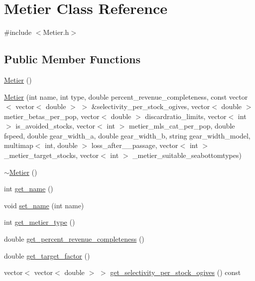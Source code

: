 \hypertarget{class_metier}{}\section{Metier Class Reference}
\label{class_metier}


{\ttfamily \#include $<$Metier.\+h$>$}

\subsection*{Public Member Functions}
\begin{DoxyCompactItemize}
\item 
\mbox{\hyperlink{class_metier_afc62233bc20706b775f08a82bfd8fc4b}{Metier}} ()
\item 
\mbox{\hyperlink{class_metier_a362481dafaec1397c8537350038492e6}{Metier}} (int name, int type, double percent\+\_\+revenue\+\_\+completeness, const vector$<$ vector$<$ double $>$ $>$ \&selectivity\+\_\+per\+\_\+stock\+\_\+ogives, vector$<$ double $>$ metier\+\_\+betas\+\_\+per\+\_\+pop, vector$<$ double $>$ discardratio\+\_\+limits, vector$<$ int $>$ is\+\_\+avoided\+\_\+stocks, vector$<$ int $>$ metier\+\_\+mls\+\_\+cat\+\_\+per\+\_\+pop, double fspeed, double gear\+\_\+width\+\_\+a, double gear\+\_\+width\+\_\+b, string gear\+\_\+width\+\_\+model, multimap$<$ int, double $>$ loss\+\_\+after\+\_\+\_\+passage, vector$<$ int $>$ \+\_\+metier\+\_\+target\+\_\+stocks, vector$<$ int $>$ \+\_\+metier\+\_\+suitable\+\_\+seabottomtypes)
\item 
\mbox{\hyperlink{class_metier_a9c20fd76517abece79dadf52cb8e189c}{$\sim$\+Metier}} ()
\item 
int \mbox{\hyperlink{class_metier_af52f1bba643a43ddb189227489338218}{get\+\_\+name}} ()
\item 
void \mbox{\hyperlink{class_metier_a732445105711a0852751e7ae96f9854e}{set\+\_\+name}} (int name)
\item 
int \mbox{\hyperlink{class_metier_a48edef2d9f0460af29cffed08b28843e}{get\+\_\+metier\+\_\+type}} ()
\item 
double \mbox{\hyperlink{class_metier_a1aafee0c10408e1d451f41033da884bb}{get\+\_\+percent\+\_\+revenue\+\_\+completeness}} ()
\item 
double \mbox{\hyperlink{class_metier_a2d00cf1a76b85696c61509755e9c1bd3}{get\+\_\+target\+\_\+factor}} ()
\item 
vector$<$ vector$<$ double $>$ $>$ \mbox{\hyperlink{class_metier_ae86e6f7f4dae4b20600b305071381ccc}{get\+\_\+selectivity\+\_\+per\+\_\+stock\+\_\+ogives}} () const

\end{DoxyCompactItemize}

